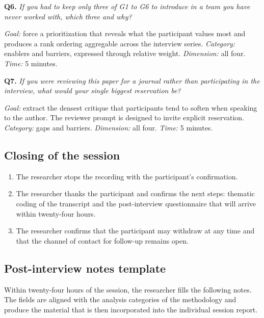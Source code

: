 \medskip
\noindent\textbf{Q6.} \emph{If you had to keep only three of G1 to G6 to introduce in a team you have never worked with, which three and why?}

\noindent\emph{Goal:} force a prioritization that reveals what the participant values most and produces a rank ordering aggregable across the interview series. \emph{Category:} enablers and barriers, expressed through relative weight. \emph{Dimension:} all four. \emph{Time:} 5 minutes.

\medskip
\noindent\textbf{Q7.} \emph{If you were reviewing this paper for a journal rather than participating in the interview, what would your single biggest reservation be?}

\noindent\emph{Goal:} extract the densest critique that participants tend to soften when speaking to the author. The reviewer prompt is designed to invite explicit reservation. \emph{Category:} gaps and barriers. \emph{Dimension:} all four. \emph{Time:} 5 minutes.

\subsection*{Closing of the session}

\begin{enumerate}[itemsep=4pt,topsep=2pt]
  \item The researcher stops the recording with the participant's confirmation.
  \item The researcher thanks the participant and confirms the next steps: thematic coding of the transcript and the post-interview questionnaire that will arrive within twenty-four hours.
  \item The researcher confirms that the participant may withdraw at any time and that the channel of contact for follow-up remains open.
\end{enumerate}

\subsection*{Post-interview notes template}

Within twenty-four hours of the session, the researcher fills the following notes. The fields are aligned with the analysis categories of the methodology and produce the material that is then incorporated into the individual session report.

